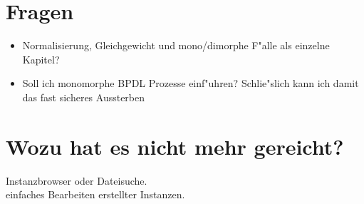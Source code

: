 \documentclass[11pt, a4paper, german]{article}
\begin{document}
\clearpage


\clearpage

\section{Fragen}
\begin{itemize}
	\item Normalisierung, Gleichgewicht und mono/dimorphe F"alle als einzelne Kapitel?
	\item Soll ich monomorphe BPDL Prozesse einf"uhren? Schlie"slich kann ich damit das fast sicheres Aussterben 
\end{itemize}

\section{Wozu hat es nicht mehr gereicht?}
Instanzbrowser oder Dateisuche.\\
einfaches Bearbeiten erstellter Instanzen.\\
\end{document}
